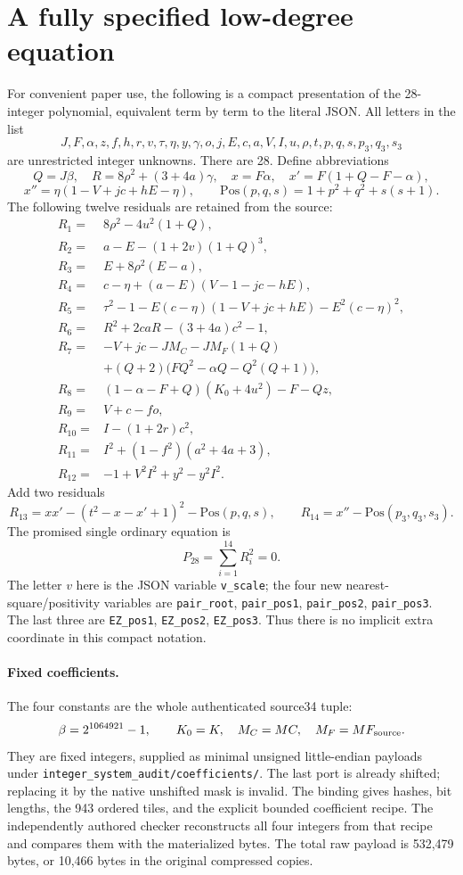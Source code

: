 \section{A fully specified low-degree equation}
For convenient paper use, the following is a compact presentation of the
28-integer polynomial, equivalent term by term to the literal JSON. All
letters in the list
\[
 J,F,\alpha,z,f,h,r,v,\tau,\eta,y,\gamma,o,j,E,c,a,V,I,u,\rho,
 t,p,q,s,p_3,q_3,s_3
\]
are unrestricted integer unknowns. There are 28. Define abbreviations
\[
 Q=J\beta,\quad R=8\rho^2+(3+4a)\gamma,\quad
 x=F\alpha,\quad x'=F(1+Q-F-\alpha),
\]
\[
 x''=\eta(1-V+jc+hE-\eta),\qquad
 \mathrm{Pos}(p,q,s)=1+p^2+q^2+s(s+1).
\]
The following twelve residuals are retained from the source:
\begin{align*}
 R_1={}&8\rho^2-4u^2(1+Q),\\
 R_2={}&a-E-(1+2v)(1+Q)^3,\\
 R_3={}&E+8\rho^2(E-a),\\
 R_4={}&c-\eta+(a-E)(V-1-jc-hE),\\
 R_5={}&\tau^2-1-E(c-\eta)(1-V+jc+hE)-E^2(c-\eta)^2,\\
 R_6={}&R^2+2caR-(3+4a)c^2-1,\\
 R_7={}&-V+jc-JM_C-JM_F(1+Q)\\
       &+(Q+2)\bigl(FQ^2-\alpha Q-Q^2(Q+1)\bigr),\\
 R_8={}&(1-\alpha-F+Q)(K_0+4u^2)-F-Qz,\\
 R_9={}&V+c-fo,\\
 R_{10}={}&I-(1+2r)c^2,\\
 R_{11}={}&I^2+(1-f^2)(a^2+4a+3),\\
 R_{12}={}&-1+V^2I^2+y^2-y^2I^2.
\end{align*}
Add two residuals
\[
 R_{13}=xx'-(t^2-x-x'+1)^2-\mathrm{Pos}(p,q,s),\qquad
 R_{14}=x''-\mathrm{Pos}(p_3,q_3,s_3).
\]
The promised single ordinary equation is
\[
 \boxed{\quad P_{28}=\sum_{i=1}^{14}R_i^2=0.\quad}
\]
The letter $v$ here is the JSON variable \texttt{v\_scale}; the four
new nearest-square/positivity variables are
\texttt{pair\_root}, \texttt{pair\_pos1}, \texttt{pair\_pos2},
\texttt{pair\_pos3}. The last three are \texttt{EZ\_pos1},
\texttt{EZ\_pos2}, \texttt{EZ\_pos3}. Thus there is no implicit extra
coordinate in this compact notation.

\paragraph{Fixed coefficients.}
The four constants are the whole authenticated source34 tuple:
\[
 \beta=2^{1064921}-1,\qquad K_0=K,\quad M_C=MC,\quad M_F=MF_{\rm source}.
\]
They are fixed integers, supplied as minimal unsigned little-endian
payloads under \texttt{integer\_system\_audit/coefficients/}.
The last port is already shifted; replacing it by the native unshifted
mask is invalid. The binding gives hashes, bit lengths, the 943 ordered
tiles, and the explicit bounded coefficient recipe. The independently
authored checker reconstructs all four integers from that recipe and
compares them with the materialized bytes. The total raw payload is
532,479 bytes, or 10,466 bytes in the original compressed copies.

